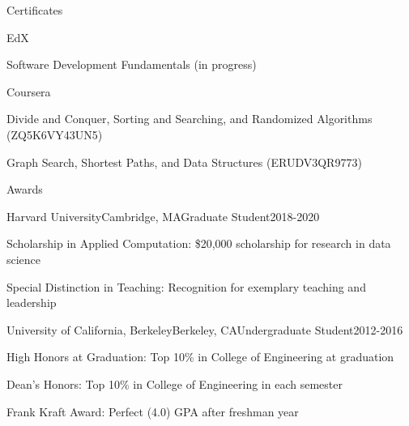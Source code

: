 \documentclass{resume} %
\begin{document}
\begin{rSection}{Certificates}

\begin{rSubsection}{EdX}{}{}{}
	\item Software Development Fundamentals (in progress)
\end{rSubsection}
\begin{rSubsection}{Coursera}{}{}{}
	\item Divide and Conquer, Sorting and Searching, and Randomized Algorithms (ZQ5K6VY43UN5)
	\item Graph Search, Shortest Paths, and Data Structures (ERUDV3QR9773)
\end{rSubsection}

\end{rSection}

\begin{rSection}{Awards}

\begin{rSubsection}{Harvard University}{Cambridge, MA}{Graduate Student}{2018-2020}
	\item Scholarship in Applied Computation: \$20,000 scholarship for research in data science
	\item Special Distinction in Teaching: Recognition for exemplary teaching and leadership
\end{rSubsection}
\begin{rSubsection}{University of California, Berkeley}{Berkeley, CA}{Undergraduate Student}{2012-2016}
	\item High Honors at Graduation: Top 10\% in College of Engineering at graduation
	\item Dean's Honors: Top 10\% in College of Engineering in each semester
	\item Frank Kraft Award: Perfect (4.0) GPA after freshman year
\end{rSubsection}

\end{rSection}
\end{document}
